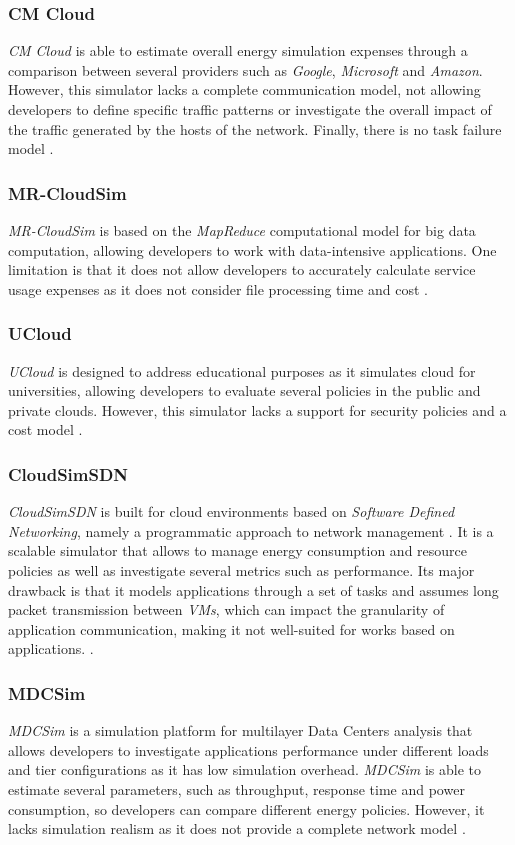 {\subsubsection*{CM Cloud}
\emph{CM Cloud} \cite{alves2016cm} is able to estimate overall energy simulation expenses through a comparison between several providers such as \emph{Google}, \emph{Microsoft} and \emph{Amazon}. However, this simulator lacks a complete communication model, not allowing developers to define specific traffic patterns or investigate the overall impact of the traffic generated by the hosts of the network. Finally, there is no task failure model \cite{mansouri2020cloud}.
\subsubsection*{MR-CloudSim}
\emph{MR-CloudSim} \cite{jung2012mr} is based on the \emph{MapReduce} computational model \cite{dean2008mapreduce} for big data computation, allowing developers to work with data-intensive applications. One limitation is that it does not allow developers to accurately calculate service usage expenses as it does not consider file processing time and cost \cite{mansouri2020cloud}.
\subsubsection*{UCloud}
\emph{UCloud} \cite{sqalli2012ucloud} is designed to address educational purposes as it simulates cloud for universities, allowing developers to evaluate several policies in the public and private clouds. However, this simulator lacks a support for security policies and a cost model \cite{mansouri2020cloud}.
\subsubsection*{CloudSimSDN}
\emph{CloudSimSDN} \cite{son2015cloudsimsdn} is built for cloud environments based on \emph{Software Defined Networking}, namely a programmatic approach to network management \cite{benzekki2016software}. It is a scalable simulator that allows to manage energy consumption and resource policies as well as investigate several metrics such as performance. Its major drawback is that it models applications through a set of tasks and assumes long packet transmission between \emph{VMs}, which can impact the granularity of application communication, making it not well-suited for works based on applications. \cite{khalil2017cloud} \cite{abreu2020comparative}.
\subsubsection*{MDCSim}
\emph{MDCSim} \cite{lim2009mdcsim} is a simulation platform for multilayer Data Centers analysis that allows developers to investigate applications performance under different loads and tier configurations as it has low simulation overhead. \emph{MDCSim} is able to estimate several parameters, such as throughput, response time and power consumption, so developers can compare different energy policies. However, it lacks simulation realism as it does not provide a complete network model \cite{mansouri2020cloud} \cite{patel2016comprehensive}.
}
